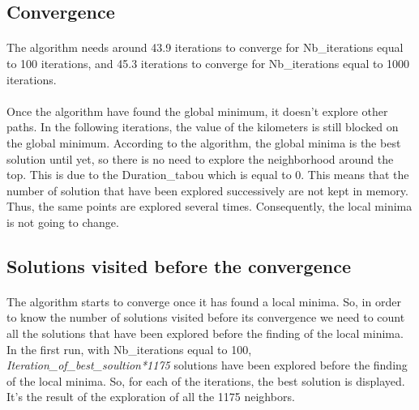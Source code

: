 \documentclass[12pt,oneside,a4paper]{article}
\begin{document}
\subsection{Convergence}
\paragraph{}
    The algorithm needs around 43.9 iterations to converge for Nb\_iterations equal to 100 iterations, and 45.3 iterations to converge for Nb\_iterations equal to 1000 iterations. 
\paragraph{}
    Once the algorithm have found the global minimum, it doesn't explore other paths. In the following iterations, the value of the kilometers is still blocked on the global minimum. 
    According to the algorithm, the global minima is the best solution until yet, so there is no need to explore the neighborhood around the top.  
    This is due to the Duration\_tabou which is equal to 0. This means that the number of solution that have been explored successively are not kept in memory. 
    Thus, the same points are explored several times. Consequently, the local minima is not going to change.

\newpage
\subsection{Solutions visited before the convergence}
\paragraph{}
    The algorithm starts to converge once it has found a local minima.
    So, in order to know the number of solutions visited before its convergence we need to count all the solutions 
    that have been explored before the finding of the local minima. 
    In the first run, with Nb\_iterations equal to 100, \textit{Iteration\_of\_best\_soultion*1175} solutions have been explored before the finding of the local minima. 
    So, for each of the iterations, the best solution is displayed. It’s the result of the exploration of all the 1175 neighbors.
\end{document}
